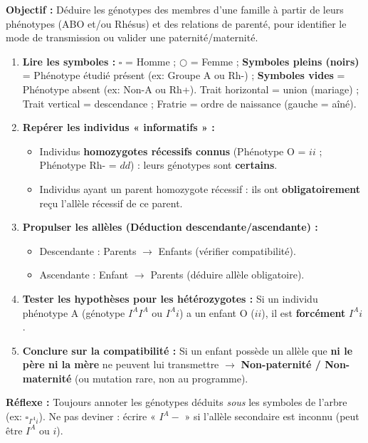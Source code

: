 \documentclass[11pt]{article}
\begin{document}
\begin{methode}
    \textbf{Objectif :} Déduire les génotypes des membres d'une famille à partir de leurs phénotypes (ABO et/ou Rhésus) et des relations de parenté, pour identifier le mode de transmission ou valider une paternité/maternité.
    \begin{enumerate}
        \item \textbf{Lire les symboles :} $\square$ = Homme ; $\bigcirc$ = Femme ; \textbf{Symboles pleins (noirs)} = Phénotype étudié présent (ex: Groupe A ou Rh-) ; \textbf{Symboles vides} = Phénotype absent (ex: Non-A ou Rh+). Trait horizontal = union (mariage) ; Trait vertical = descendance ; Fratrie = ordre de naissance (gauche = aîné).
        \item \textbf{Repérer les individus « informatifs » :} 
        \begin{itemize}
            \item Individus \textbf{homozygotes récessifs connus} (Phénotype O = $ii$ ; Phénotype Rh- = $dd$) : leurs génotypes sont \textbf{certains}.
            \item Individus ayant un parent homozygote récessif : ils ont \textbf{obligatoirement} reçu l'allèle récessif de ce parent.
        \end{itemize}
        \item \textbf{Propulser les allèles (Déduction descendante/ascendante) :} 
        \begin{itemize}
            \item Descendante : Parents $\rightarrow$ Enfants (vérifier compatibilité).
            \item Ascendante : Enfant $\rightarrow$ Parents (déduire allèle obligatoire).
        \end{itemize}
        \item \textbf{Tester les hypothèses pour les hétérozygotes :} Si un individu phénotype A (génotype $I^A I^A$ ou $I^A i$) a un enfant O ($ii$), il est \textbf{forcément} $I^A i$.
        \item \textbf{Conclure sur la compatibilité :} Si un enfant possède un allèle que \textbf{ni le père ni la mère} ne peuvent lui transmettre $\rightarrow$ \textbf{Non-paternité / Non-maternité} (ou mutation rare, non au programme).
    \end{enumerate}
    \textbf{Réflexe :} Toujours annoter les génotypes déduits \emph{sous} les symboles de l'arbre (ex: $\square_{I^A i}$). Ne pas deviner : écrire « $I^A-$ » si l'allèle secondaire est inconnu (peut être $I^A$ ou $i$).
\end{methode}
\end{document}
